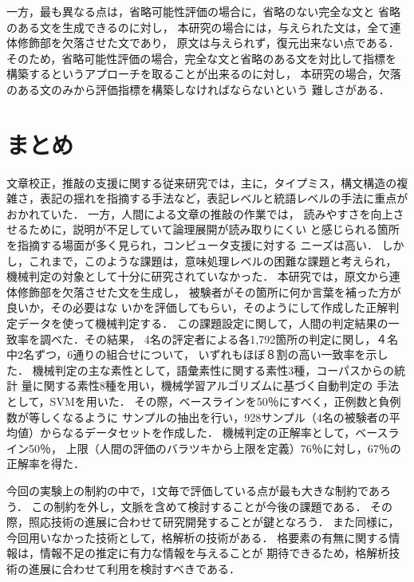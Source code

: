 \documentclass[japanese]{jnlp_1.3e}
\begin{document}
一方，最も異なる点は，省略可能性評価の場合に，省略のない完全な文と
省略のある文を生成できるのに対し，
本研究の場合には，与えられた文は，全て連体修飾部を欠落させた文であり，
原文は与えられず，復元出来ない点である．
そのため，省略可能性評価の場合，完全な文と省略のある文を対比して指標を
構築するというアプローチを取ることが出来るのに対し，
本研究の場合，欠落のある文のみから評価指標を構築しなければならないという
難しさがある．



\section{まとめ}

文章校正，推敲の支援に関する従来研究では，主に，タイプミス，構文構造の複
雑さ，表記の揺れを指摘する手法など，表記レベルと統語レベルの手法に重点が
おかれていた．
一方，人間による文章の推敲の作業では，
読みやすさを向上させるために，説明が不足していて論理展開が読み取りにくい
と感じられる箇所を指摘する場面が多く見られ，コンピュータ支援に対する
ニーズは高い．
しかし，これまで，このような課題は，意味処理レベルの困難な課題と考えられ，
機械判定の対象として十分に研究されていなかった．
本研究では，原文から連体修飾部を欠落させた文を生成し，
被験者がその箇所に何か言葉を補った方が良いか，その必要はな
いかを評価してもらい，そのようにして作成した正解判定データを使って機械判定する．
この課題設定に関して，人間の判定結果の一致率を調べた．その結果，
4名の評定者による各1,792箇所の判定に関し，４名中2名ずつ，6通りの組合せについて，
いずれもほぼ８割の高い一致率を示した．
機械判定の主な素性として，語彙素性に関する素性3種，コーパスからの統計
量に関する素性8種を用い，機械学習アルゴリズムに基づく自動判定の
手法として，SVMを用いた．
その際，ベースラインを50{\kern0pt}％にすべく，正例数と負例数が等しくなるように
サンプルの抽出を行い，928サンプル（4名の被験者の平均値）からなるデータセットを作成した．
機械判定の正解率として，ベースライン50{\kern0pt}％，
上限（人間の評価のバラツキから上限を定義）76{\kern0pt}％に対し，67{\kern0pt}％の正解率を得た．

今回の実験上の制約の中で，1文毎で評価している点が最も大きな制約であろう．
この制約を外し，文脈を含めて検討することが今後の課題である．
その際，照応技術の進展に合わせて研究開発することが鍵となろう．
また同様に，今回用いなかった技術として，格解析の技術がある．
格要素の有無に関する情報は，情報不足の推定に有力な情報を与えることが
期待できるため，格解析技術の進展に合わせて利用を検討すべきである．
\end{document}
